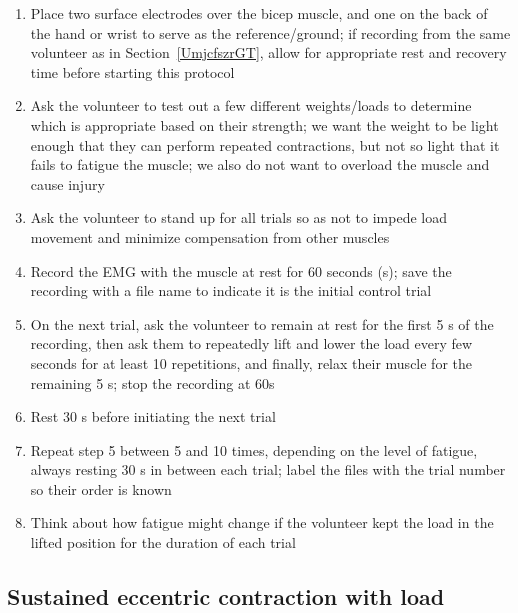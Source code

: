 \documentclass{article}
\begin{document}
\begin{enumerate}
\item Place two surface electrodes over the bicep muscle, and one on the back of the hand or wrist to serve as the reference/ground; if recording from the same volunteer as in Section~\ref{UmjcfszrGT}, allow for appropriate rest and recovery time before starting this protocol
\item Ask the volunteer to test out a few different weights/loads to determine which is appropriate based on their strength; we want the weight to be light enough that they can perform repeated contractions, but not so light that it fails to fatigue the muscle; we also do not want to overload the muscle and cause injury
\item Ask the volunteer to stand up for all trials so as not to impede load movement and minimize compensation from other muscles
\item Record the EMG with the muscle at rest for 60 seconds (s); save the recording with a file name to indicate it is the initial control trial
\item On the next trial, ask the volunteer to remain at rest for the first 5 s of the recording, then ask them to repeatedly lift and lower the load every few seconds for at least 10 repetitions, and finally, relax their muscle for the remaining 5 s; stop the recording at 60s
\item Rest 30 s before initiating the next trial
\item Repeat step 5 between 5 and 10 times, depending on the level of fatigue, always resting 30 s in between each trial; label the files with the trial number so their order is known
\item Think about how fatigue might change if the volunteer kept the load in the lifted position for the duration of each trial
\end{enumerate}

\subsection{Sustained eccentric contraction with load}
\end{document}

